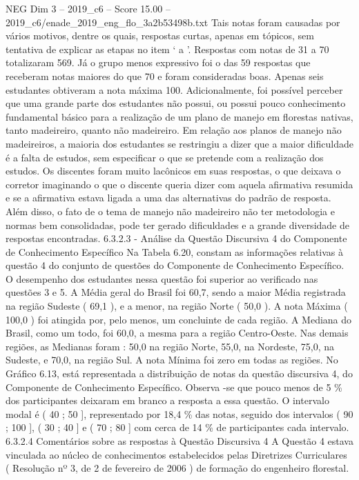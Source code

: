 \begin{textsample}{NEG Dim 3 – 2019\_c6 – Score 15.00 – 2019\_c6/enade\_2019\_eng\_flo\_3a2b53498b.txt}
Tais notas foram causadas por vários motivos, dentre os quais, respostas curtas, apenas em tópicos, sem tentativa de explicar as etapas no item ‘ a ’.
Respostas com notas de 31 a 70 totalizaram 569.
Já o grupo menos expressivo foi o das 59 respostas que receberam notas maiores do que 70 e foram consideradas boas.
Apenas seis estudantes obtiveram a nota máxima 100.
Adicionalmente, foi possível perceber que uma grande parte dos estudantes não possui, ou possui pouco conhecimento fundamental básico para a realização de um plano de manejo em florestas nativas, tanto madeireiro, quanto não madeireiro.
Em relação aos planos de manejo não madeireiros, a maioria dos estudantes se restringiu a dizer que a maior dificuldade é a falta de estudos, sem especificar o que se pretende com a realização dos estudos.
Os discentes foram muito lacônicos em suas respostas, o que deixava o corretor imaginando o que o discente queria dizer com aquela afirmativa resumida e se a afirmativa estava ligada a uma das alternativas do padrão de resposta.
Além disso, o fato de o tema de manejo não madeireiro não ter metodologia e normas bem consolidadas, pode ter gerado dificuldades e a grande diversidade de respostas encontradas. 6.3.2.3 - Análise da Questão Discursiva 4 do Componente de Conhecimento Específico Na Tabela 6.20, constam as informações relativas à questão 4 do conjunto de questões do Componente de Conhecimento Específico.
O desempenho dos estudantes nessa questão foi superior ao verificado nas questões 3 e 5.
A Média geral do Brasil foi 60,7, sendo a maior Média registrada na região Sudeste ( 69,1 ), e a menor, na região Norte ( 50,0 ).
A nota Máxima ( 100,0 ) foi atingida por, pelo menos, um concluinte de cada região.
A Mediana do Brasil, como um todo, foi 60,0, a mesma para a região Centro-Oeste.
Nas demais regiões, as Medianas foram : 50,0 na região Norte, 55,0, na Nordeste, 75,0, na Sudeste, e 70,0, na região Sul.
A nota Mínima foi zero em todas as regiões.
No Gráfico 6.13, está representada a distribuição de notas da questão discursiva 4, do Componente de Conhecimento Específico.
Observa -se que pouco menos de 5 \% dos participantes deixaram em branco a resposta a essa questão.
O intervalo modal é ( 40 ; 50 ], representado por 18,4 \% das notas, seguido dos intervalos ( 90 ; 100 ], ( 30 ; 40 ] e ( 70 ; 80 ] com cerca de 14 \% de participantes cada intervalo. 6.3.2.4 Comentários sobre as respostas à Questão Discursiva 4 A Questão 4 estava vinculada ao núcleo de conhecimentos estabelecidos pelas Diretrizes Curriculares ( Resolução nº 3, de 2 de fevereiro de 2006 ) de formação do engenheiro florestal.

\end{textsample}
